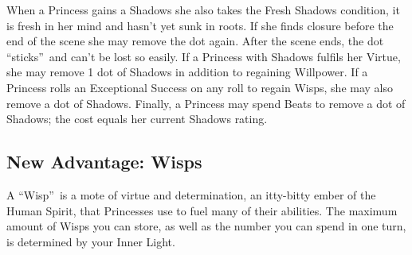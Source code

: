 When a Princess gains a Shadows she also takes the Fresh Shadows condition, it is fresh in her mind and hasn't yet sunk in roots. If she finds closure before the end of the scene she may remove the dot again. After the scene ends, the dot \textquotedblleft sticks\textquotedblright\, and can't be lost so easily. If a Princess with Shadows fulfils her Virtue, she may remove 1 dot of Shadows in addition to regaining Willpower. If a Princess rolls an Exceptional Success on any roll to regain Wisps, she may also remove a dot of Shadows. Finally, a Princess may spend Beats to remove a dot of Shadows; the cost equals her current Shadows rating. 




\subsection*{New Advantage: Wisps}

A \textquotedblleft Wisp\textquotedblright\, is a mote of virtue and determination, an itty-bitty ember of the Human Spirit, that Princesses use to fuel many of their abilities. The maximum amount of Wisps you can store, as well as the number you can spend in one turn, is determined by your Inner Light. 

